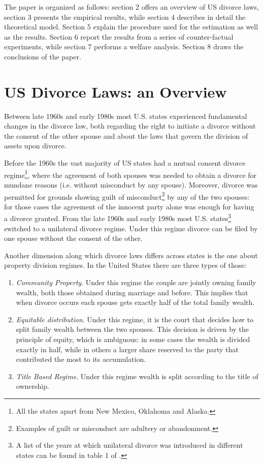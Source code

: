 \documentclass[12pt]{article}
\numberwithin{table}{section}
\begin{document}
The paper is organized as follows: section 2 offers an overview of US divorce laws, section 3 presents the empirical results, while section 4 describes in detail the theoretical model. Section 5 explain the procedure used for the estimation as well as the results. Section 6 report the results from a series of counter-factual experiments, while section 7 performs a welfare analysis. Section 8 draws the conclusions of the paper.

\section{US Divorce Laws: an Overview}
Between late 1960s and early 1980s most U.S. states experienced fundamental changes in the divorce law, both regarding the right to initiate a divorce without the consent of the other spouse and about the laws that govern the division of assets upon divorce.

Before the 1960s the vast majority of US states had a mutual consent divorce regime\footnote{All the states apart from New Mexico, Oklahoma and Alaska.}, where the agreement of both spouses was needed to obtain a divorce for mundane reasons (i.e. without misconduct by any spouse). Moreover, divorce was permitted for grounds showing guilt of misconduct\footnote{Examples of guilt or misconduct are adultery or abandonment.} by any of the two spouses: for those cases the agreement of the innocent party alone was enough for having a divorce granted.
From the late 1960s and early 1980s most U.S. states\footnote{A list of the years at which unilateral divorce was introduced in different states can be found in table 1 of \cite{ciacci2017}.} switched to a unilateral divorce regime. Under this regime divorce can be filed by one spouse without the consent of the other.

Another dimension along which divorce laws differs across states is the one about property division regimes. In the United States there are three types of those:
\begin{enumerate}
\item \textit{Community Property}. Under this regime the couple are jointly owning family wealth, both those obtained during marriage and before. This implies that when divorce occurs each spouse gets exactly half of the total family wealth.
\item \textit{Equitable distribution}. Under this regime, it is the court that decides how to split family wealth between the two spouses. This decision is driven by the principle of equity, which is ambiguous: in some cases the wealth is divided exactly in half, while in others a larger share reserved to the party that contributed the most to its accumulation.
\item \textit{Title Based Regime}. Under this regime wealth is split according to the title of ownership.	
\end{enumerate}
\end{document}
